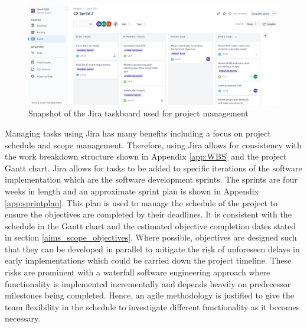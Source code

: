 \begin{figure}[H]
    \centering
    \includegraphics[scale=0.4]{images/jira taskboard.png}
    \caption{Snapshot of the Jira taskboard used for project management}
    \label{fig:jira_taskboard}
\end{figure}

Managing tasks using Jira has many benefits including a focus on project schedule and scope management. Therefore, using Jira allows for consistency with the work breakdown structure shown in Appendix \ref{app:WBS} and the project Gantt chart. Jira allows for tasks to be added to specific iterations of the software implementation which are the software development sprints. The sprints are four weeks in length and an approximate sprint plan is shown in Appendix \ref{app:sprintplan}. This plan is used to manage the schedule of the project to ensure the objectives are completed by their deadlines. It is consistent with the schedule in the Gantt chart and the estimated objective completion dates stated in section \ref{aims_scope_objectives}. Where possible, objectives are designed such that they can be developed in parallel to mitigate the risk of unforeseen delays in early implementations which could be carried down the project timeline. These risks are prominent with a waterfall software engineering approach where functionality is implemented incrementally and depends heavily on predecessor milestones being completed. Hence, an agile methodology is justified to give the team flexibility in the schedule to investigate different functionality as it becomes necessary.